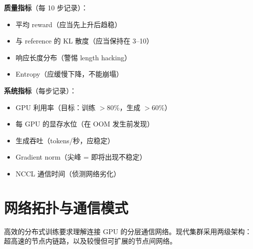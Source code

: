\begin{keybox}
\textbf{质量指标}（每 10 步记录）：

\begin{itemize}
  \item 平均 reward（应当先上升后趋稳）
  \item 与 reference 的 KL 散度（应当保持在 3--10）
  \item 响应长度分布（警惕 length hacking）
  \item Entropy（应缓慢下降，不能崩塌）
\end{itemize}

\textbf{系统指标}（每步记录）：

\begin{itemize}
  \item GPU 利用率（目标：训练 $>$80\%，生成 $>$60\%）
  \item 每 GPU 的显存水位（在 OOM 发生前发现）
  \item 生成吞吐（tokens/秒，应稳定）
  \item Gradient norm（尖峰 = 即将出现不稳定）
  \item NCCL 通信时间（侦测网络劣化）
\end{itemize}
\end{keybox}

\section{网络拓扑与通信模式}
\label{sec:network-topology}

高效的分布式训练要求理解连接 GPU 的分层通信网络。现代集群采用两级架构：超高速的节点内链路，以及较慢但可扩展的节点间网络。

